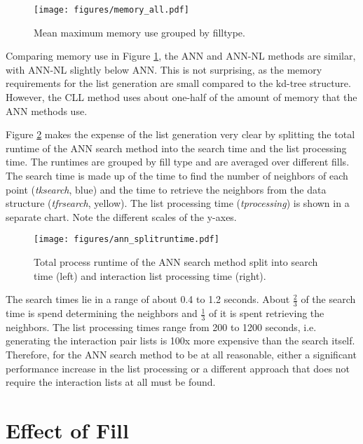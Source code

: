 \begin{figure}[h]
	\centering
	\texttt{[image: figures/memory\_all.pdf]}
	\caption{Mean maximum memory use grouped by filltype.}
	\label{FIG:memoryall}
\end{figure}

\pagebreak{}

Comparing memory use in Figure \ref{FIG:memoryall}, the ANN and ANN-NL methods are similar, with ANN-NL slightly below ANN. This is not surprising, as the memory requirements for the list generation are small compared to the kd-tree structure. However, the CLL method uses about one-half of the amount of memory that the ANN methods use.

Figure \ref{FIG:splitruntimeann} makes the expense of the list generation very clear by splitting the total runtime of the ANN search method into the search time and the list processing time. The runtimes are grouped by fill type and are averaged over different fills. The search time is made up of the time to find the number of neighbors of each point ({\itshape tksearch}, blue) and the time to retrieve the neighbors from the data structure ({\itshape tfrsearch}, yellow). The list processing time ({\itshape tprocessing}) is shown in a separate chart.  Note the different scales of the y-axes. 

\begin{figure}[h]
	\centering
	\texttt{[image: figures/ann\_splitruntime.pdf]}
	\caption{Total process runtime of the ANN search method split into search time (left) and interaction list processing time (right).}
	\label{FIG:splitruntimeann}
\end{figure}

The search times lie in a range of about 0.4 to 1.2 seconds. About $\frac{2}{3}$ of the search time is spend determining the neighbors and $\frac{1}{3}$ of it is spent retrieving the neighbors. The list processing times range from 200 to 1200 seconds, i.e. generating the interaction pair lists is 100x more expensive than the search itself. Therefore, for the ANN search method to be at all reasonable, either a significant performance increase in the list processing or a different approach that does not require the interaction lists at all must be found. 

\section{Effect of Fill}
\label{SECTION:ANALYSISFILL}

